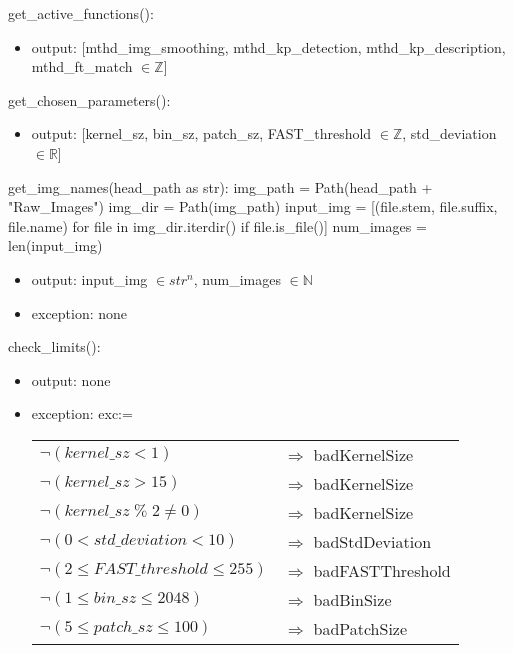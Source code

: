 \documentclass[12pt, titlepage]{article}
\begin{document}
\noindent get\_active\_functions():
\begin{itemize}
  \item output: [mthd\_img\_smoothing, mthd\_kp\_detection, 
  mthd\_kp\_description, mthd\_ft\_match $\in \mathbb{Z}$] 
\end{itemize}


\noindent get\_chosen\_parameters():
\begin{itemize}
  \item output: [kernel\_sz, bin\_sz, patch\_sz, FAST\_threshold $\in \mathbb{Z}$,  
  std\_deviation $ \in \mathbb{R}$]
\end{itemize}


\noindent get\_img\_names(head\_path as str): \newline \newline
img\_path = Path(head\_path + "Raw\_Images") \newline
img\_dir = Path(img\_path) \newline
input\_img = [(file.stem, file.suffix, file.name) 
for file in img\_dir.iterdir() if file.is\_file()] \newline
num\_images = len(input\_img)
\begin{itemize}
\item output: input\_img $\in str^{n}$, num\_images $\in \mathbb{N}$
\item exception: none 
\end{itemize}


\noindent check\_limits():
\begin{itemize}
  \item output: none
  \item exception: exc:=
  \noindent \begin{longtable*}[l]{l l} 
    $\neg (kernel\_sz < 1)$ & $\Rightarrow$ badKernelSize\\
    $\neg (kernel\_sz > 15)$ & $\Rightarrow$ badKernelSize\\
    $\neg (kernel\_sz \; \% \; 2 \neq 0)$ & $\Rightarrow$ badKernelSize\\
    $\neg (0 < std\_deviation < 10)$ & $\Rightarrow$ badStdDeviation\\
    $\neg (2 \leq FAST\_threshold \leq 255)$ & $\Rightarrow$ badFASTThreshold\\
    $\neg (1 \leq bin\_sz \leq 2048)$ & $\Rightarrow$ badBinSize\\
    $\neg (5 \leq patch\_sz \leq 100)$ & $\Rightarrow$ badPatchSize\\
    \end{longtable*}
\end{itemize}
\end{document}
